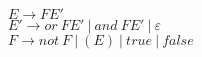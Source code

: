 \begin{center}
    $E \rightarrow FE'$ \\
    $E' \rightarrow or \ FE' \ | \ and \ FE' \ | \ \varepsilon $\\
    $F \rightarrow not \ F \ | \ (E) \ | \ true \ | \ false$ \\
\end{center}
